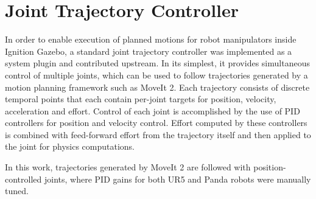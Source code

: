 \section{Joint Trajectory Controller}\label{app:joint_trajectory_controller}

In order to enable execution of planned motions for robot manipulators inside Ignition Gazebo, a standard joint trajectory controller was implemented as a system plugin and contributed upstream. In its simplest, it provides simultaneous control of multiple joints, which can be used to follow trajectories generated by a motion planning framework such as MoveIt 2. Each trajectory consists of discrete temporal points that each contain per-joint targets for position, velocity, acceleration and effort. Control of each joint is accomplished by the use of PID controllers for position and velocity control. Effort computed by these controllers is combined with feed-forward effort from the trajectory itself and then applied to the joint for physics computations.

In this work, trajectories generated by MoveIt 2 are followed with position-controlled joints, where PID gains for both UR5 and Panda robots were manually tuned.
